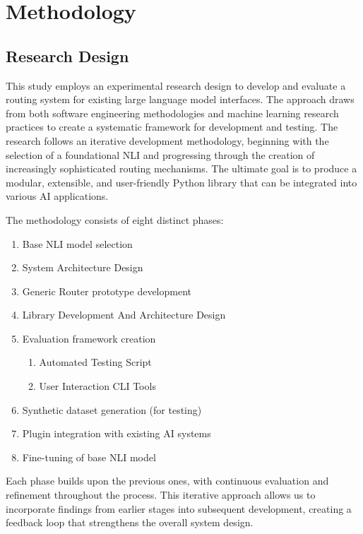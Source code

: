 \chapter{Methodology}
\label{ch:method} %

\section{Research Design}

This study employs an experimental research design to develop and evaluate a routing system for existing large language model interfaces. The approach draws from both software engineering methodologies and machine learning research practices to create a systematic framework for development and testing. The research follows an iterative development methodology, beginning with the selection of a foundational NLI and progressing through the creation of increasingly sophisticated routing mechanisms. The ultimate goal is to produce a modular, extensible, and user-friendly Python library that can be integrated into various AI applications.

The methodology consists of eight distinct phases:

\begin{enumerate}
    \item Base NLI model selection
    \item System Architecture Design
    \item Generic Router prototype development
    \item Library Development And Architecture Design
    \item Evaluation framework creation
    \begin{enumerate}
        \item Automated Testing Script
        \item User Interaction CLI Tools
    \end{enumerate}
    \item Synthetic dataset generation (for testing)
    \item Plugin integration with existing AI systems
    \item Fine-tuning of base NLI model
\end{enumerate}

Each phase builds upon the previous ones, with continuous evaluation and refinement throughout the process. This iterative approach allows us to incorporate findings from earlier stages into subsequent development, creating a feedback loop that strengthens the overall system design.

